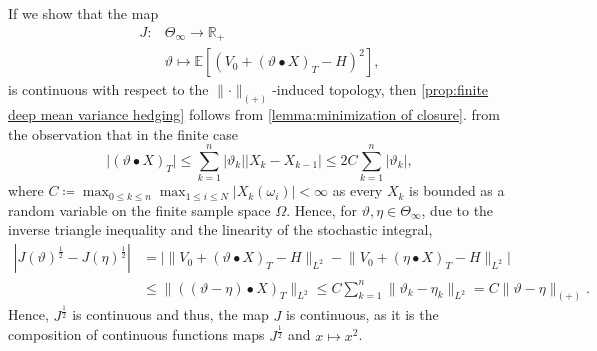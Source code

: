 \documentclass[11pt,a4paper,twoside,openany]{report}
\theoremstyle{plain} %
\theoremstyle{definition} %
\theoremstyle{remark} %
\begin{document}
If we show that the map 
\begin{align*}
    J:&\Theta_{\infty}\to\mathbb{R}_+
    \\&\vartheta\mapsto\mathbb{E}[\left(V_0+(\vartheta\bullet X)_T-H\right)^2],
\end{align*}
is continuous with respect to the \(\lVert\cdot\rVert_{(+)}\)-induced topology, then  
\cref{prop:finite deep mean variance hedging} follows from \cref{lemma:minimization of closure}. from the observation that in the finite case 
\begin{equation}
    \big|(\vartheta\bullet X)_T\big|\leq\sum_{k=1}^{n}|\vartheta_k||X_{k}-X_{k-1}|\leq2C\sum_{k=1}^n|\vartheta_k|,
\end{equation}
where \(C\coloneqq\max_{0\leq k\leq n}\max_{1\leq i\leq N}|X_k(\omega_i)|<\infty\) as every \(X_k\) is bounded as a random variable on the finite sample space \(\Omega\). Hence, for \(\vartheta,\eta\in\Theta_{\infty}\), due to the inverse triangle inequality and the linearity of the stochastic integral,
\begin{align*}
    |J(\vartheta)^{\frac{1}{2}}-J(\eta)^{\frac{1}{2}}|&=\Big|\lVert V_0+(\vartheta\bullet X)_T-H\rVert_{L^2}-\lVert V_0+(\eta\bullet X)_T-H\rVert_{L^2}\Big|
    \\&\leq\lVert ((\vartheta-\eta)\bullet X)_T\rVert_{L^2}\leq C\sum_{k=1}^n\lVert\vartheta_k-\eta_k\rVert_{L^2}=C\lVert\vartheta-\eta\rVert_{(+)}.
\end{align*}
Hence, \(J^{\frac{1}{2}}\) is continuous and 
thus, the map \(J\) is continuous, as it is the composition of continuous functions maps \(J^{\frac{1}{2}}\) and \(x\mapsto x^2\). 
\end{document}
